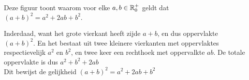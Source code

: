 \documentclass{ximera}
\begin{document}
\begin{Uitbreiding}
\begin{exercise}
\begin{image}[\width]
\end{image}


\begin{uitkomst}
Deze figuur toont waarom voor elke \(a,b \in \mathbb{R}^+_0\) geldt dat \((a+b)^2 = a^2 + 2ab + b^2\).

Inderdaad, want het grote vierkant heeft zijde \(a+b\), en dus oppervlakte \((a+b)^2\). 
En het bestaat uit twee kleinere vierkanten met oppervlaktes respectievelijk \(a^2\) en \(b^2\), en twee keer een rechthoek met oppervalkte \(ab\).
De totale oppervlakte is dus \(a^2+b^2+2ab\)
\\
Dit bewijst de gelijkheid \((a+b)^2 = a^2 + 2ab + b^2\)
\end{uitkomst}

\end{exercise}
\end{Uitbreiding}

\end{document}
